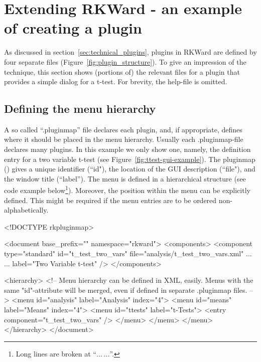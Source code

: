 \section{Extending RKWard - an example of creating a plugin}
\label{sec:example_plugin}
As discussed in section~\ref{sec:technical_plugins}, plugins in RKWard are
defined by four separate files (Figure~\ref{fig:plugin_structure}). To give an impression of the technique,
this section shows (portions of) the relevant files for a plugin that provides
a simple dialog for a t-test. For brevity, the help-file is omitted.

\subsection{Defining the menu hierarchy}
\label{sec:defining_menu_hierarchy}
A so called ``.pluginmap'' file declares each plugin, and, if appropriate, defines where it should
be placed in the menu hierarchy. Usually each .pluginmap-file declares many plugins. In this example
we only show one, namely, the definition entry for a two variable t-test (see Figure~\ref{fig:ttest-gui-example}). 
The pluginmap () gives a unique identifier (``id"), the location of the GUI description (``file"), and the window title (``label''). The menu
is defined in a hierarchical structure (see code example below\footnote{Long lines are broken at ``$\ldots~\ldots$''.}). Moreover, the position within the menu can be explicitly defined.
This might be required if the menu entries are to be ordered non-alphabetically.

\begin{footnotesize}
\begin{Code}
<!DOCTYPE rkpluginmap>

<document base_prefix="" namespace="rkward">
  <components>
    <component type="standard" id="t_test_two_vars" file="analysis/t_test_two_vars.xml" ...
      ... label="Two Variable t-test" />
  </components>

  <hierarchy>
    <!-- Menu hierarchy can be defined in XML, easily.
    Menus with the same "id"-attribute will be merged, even if defined in
    separate .pluginmap files. -->
    <menu id="analysis" label="Analysis" index="4">
      <menu id="means" label="Means" index="4">
        <menu id="ttests" label="t-Tests">
          <entry component="t_test_two_vars" />
        </menu>
      </menu>
    </menu>
  </hierarchy>
</document>
\end{Code}
\end{footnotesize}


